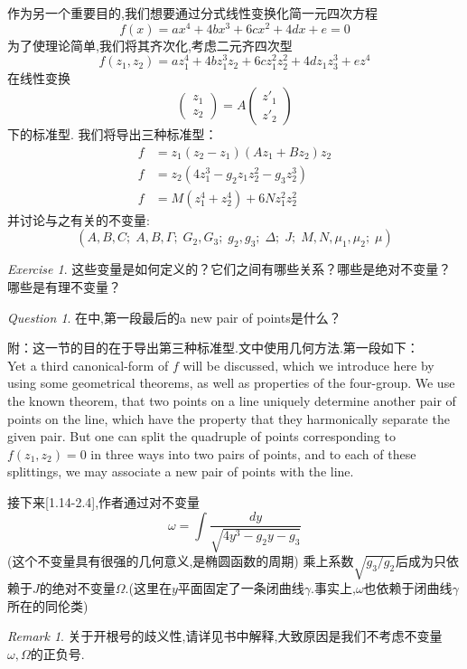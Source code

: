 \documentclass[12pt,A4paper,oneside]{amsart}
\numberwithin{equation}{section}
\theoremstyle{plain}
\theoremstyle{plain}
\theoremstyle{plain}
\numberwithin{equation}{section}
\theoremstyle{remark}
\newtheorem{remark}[theorem]{Remark}
\newtheorem{ex}[theorem]{Exercise}
\newtheorem{question}[theorem]{Question}
\begin{document}
作为另一个重要目的,我们想要通过分式线性变换化简一元四次方程
$$f(x)=ax^4+4bx^3+6cx^2+4dx+e=0$$
为了使理论简单,我们将其齐次化,考虑二元齐四次型
$$f(z_1,z_2)=az_1^4+4bz_1^3z_2+6cz_1^2z_2^2+4dz_1z_3^3+ez^4$$
在线性变换
$$\begin{pmatrix}
z_1 \\ z_2
\end{pmatrix}=A\begin{pmatrix}
z'_1 \\ z'_2
\end{pmatrix}$$
下的标准型.
我们将导出三种标准型：
\begin{equation*}
\begin{aligned}
f&=z_1(z_2-z_1)(Az_1+Bz_2)z_2\\
f&=z_2(4z_1^3-g_2z_1z_2^2-g_3z_2^3)\\
f&=M(z_1^4+z_2^4)+6Nz_1^2z_2^2
\end{aligned}
\end{equation*}
并讨论与之有关的不变量:$$(A,B,C;\;A,B,\Gamma;\;G_2,G_3;\;g_2,g_3;\;\Delta;\;J;\;M,N,\mu_1,\mu_2;\;\mu)$$
\begin{ex}
	这些变量是如何定义的？它们之间有哪些关系？哪些是绝对不变量？哪些是有理不变量？
\end{ex}
\begin{question}
	在\cite[Part I,1.12]{klein1892vorlesungen}中,第一段最后的a new pair of points是什么？
	
	附：这一节的目的在于导出第三种标准型.文中使用几何方法.第一段如下：\\
	Yet a third canonical-form of $f$ will be discussed, which we introduce here by using some geometrical theorems, as well as properties of the four-group. We use the known theorem, that two points on a line uniquely determine another pair of points on the line, which have the property that they harmonically separate the given pair. But one can split the quadruple of points corresponding to $f\left(z_{1}, z_{2}\right)=0$ in three ways into two pairs of points, and to each of these splittings, we may associate a new pair of points with the line.
\end{question}
接下来[1.14-2.4],作者通过对不变量
$$\omega=\int \frac{dy}{\sqrt{4y^3-g_2y-g_3}}$$(这个不变量具有很强的几何意义,是椭圆函数的周期)
乘上系数$\sqrt{g_3/g_2}$后成为只依赖于$J$的绝对不变量$\Omega$.(这里在$y$平面固定了一条闭曲线$\gamma$.事实上,$\omega$也依赖于闭曲线$\gamma$所在的同伦类)
\begin{remark}
	关于开根号的歧义性,请详见书中解释,大致原因是我们不考虑不变量$\omega,\Omega$的正负号.
\end{remark}
\end{document}
